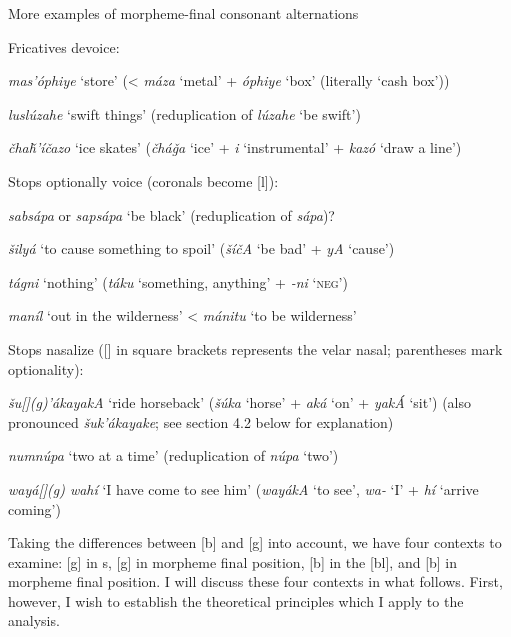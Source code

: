 \documentclass[output=paper]{LSP/langsci}
\begin{document}
\begin{exe}
\ex \label{ex:rood:8}
More examples of morpheme-final consonant alternations
\begin{xlist}
\ex Fricatives devoice:

\textit{mas'\'ophiye} `store' (< \textit{máza} `metal' + \textit{\'ophiye} `box' (literally `cash box'))

\textit{luslúzahe} `swift things' (reduplication of \textit{lúzahe} `be swift')

\textit{\v{c}ha\v{h}'í\v{c}azo} `ice skates' (\textit{\v{c}há\v{g}a} `ice' + \textit{i} `instrumental' + \textit{kaz\'o} `draw a line')

\ex Stops optionally voice (coronals become [l]):

\textit{sabsápa} or \textit{sapsápa} `be black' (reduplication of \textit{sápa})?

\textit{\v{s}ilyá} `to cause something to spoil' (\textit{\v{s}í\v{c}A} `be bad' + \textit{yA} `cause')

\textit{tágni} `nothing' (\textit{táku} `something, anything' + \textit{-ni} `\textsc{neg}')

\textit{maníl} `out in the wilderness' < \textit{mánitu} `to be wilderness'

\ex Stops nasalize ([] in square brackets represents the velar nasal; parentheses mark optionality):

\textit{\v{s}u[](g)'ákayakA} `ride horseback' (\textit{\v{s}úka} `horse' + \textit{aká} `on' + \textit{ya\-kÁ} `sit') (also pronounced \textit{\v{s}uk'ákayake}; see section 4.2 below for explanation)

\textit{numnúpa} `two at a time' (reduplication of \textit{núpa} `two')

\textit{wayá[](g) wahí} `I have come to see him' (\textit{wayákA} `to see', \textit{wa-} `I' + \textit{hí} `arrive coming')
\end{xlist}
\end{exe}

Taking the differences between [b] and [g] into account, we have four contexts to examine: [g] in s, [g] in morpheme final position, [b] in the  [bl], and [b] in morpheme final position. I will discuss these four contexts in what follows. First, however, I wish to establish the theoretical principles which I apply to the analysis.
\end{document}
